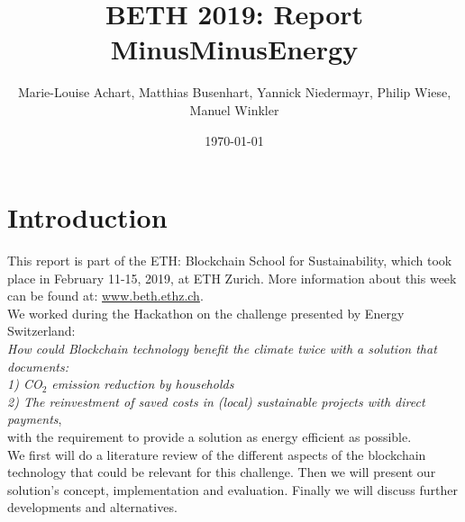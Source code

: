 \documentclass[11pt]{article}
\title{BETH 2019: Report MinusMinusEnergy}
\author{Marie-Louise Achart, Matthias Busenhart, Yannick Niedermayr, Philip Wiese, Manuel Winkler}
\date{\today}
\begin{document}
\maketitle

\section{Introduction}
This report is part of the ETH: Blockchain School for Sustainability, which took place in February 11-15, 2019, at ETH Zurich. More information about this week can be found at: \hyperref[www.beth.ethz.ch]{www.beth.ethz.ch}.\\
We worked during the Hackathon on the challenge presented by Energy Switzerland:\\ \textit{How could Blockchain technology benefit the climate twice with a solution that documents:\\
1) CO$_2$ emission reduction by households\\
2) The reinvestment of saved costs in (local) sustainable projects with direct payments},\\
with the requirement to provide a solution as energy efficient as possible.\\
We first will do a literature review of the different aspects of the blockchain technology that could be relevant for this challenge. Then we will present our solution's concept, implementation and evaluation. Finally we will discuss further developments and alternatives.\\
\end{document}
